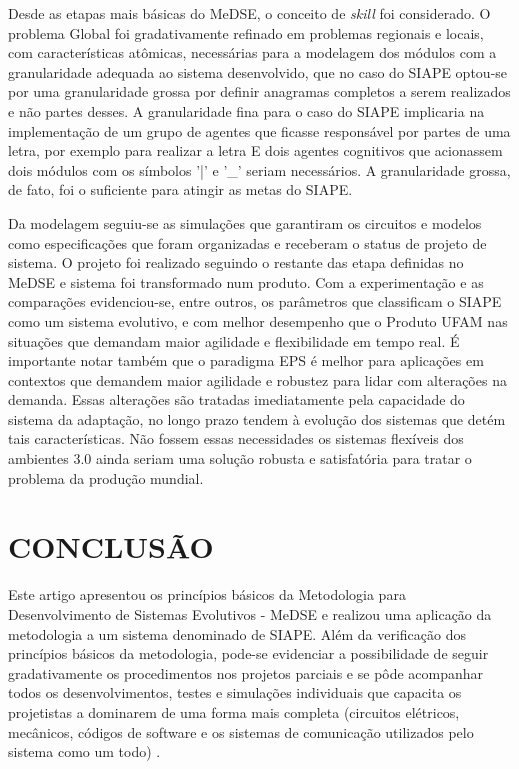 \documentclass[10pt,letterpaper,twocolumn]{IEEEtran}
\begin{document}
Desde as etapas mais básicas do MeDSE, o conceito de \textit{skill} foi considerado. O problema Global foi gradativamente refinado em problemas regionais e locais, com características atômicas, necessárias para a modelagem dos módulos com a granularidade adequada ao sistema desenvolvido, que no caso do SIAPE optou-se por uma granularidade grossa por definir anagramas completos a serem realizados e  não partes desses. A granularidade fina para o caso do SIAPE implicaria na implementação de um grupo de agentes que ficasse responsável por partes de uma letra, por exemplo para realizar a letra E dois agentes cognitivos que  acionassem dois módulos com os símbolos '|' e '\_'  seriam necessários. A granularidade grossa, de fato, foi o suficiente para atingir as metas do SIAPE.

Da modelagem seguiu-se as simulações que garantiram os circuitos e modelos como especificações que foram organizadas e receberam o status de projeto de sistema. O projeto foi realizado seguindo o restante das  etapa definidas no MeDSE e sistema foi transformado num produto. Com a experimentação e as comparações evidenciou-se, entre outros, os parâmetros que classificam o SIAPE como um sistema evolutivo, e com melhor desempenho que o Produto UFAM nas situações que demandam maior agilidade e flexibilidade em tempo real. É importante notar também que o paradigma EPS é melhor para aplicações em contextos que demandem maior agilidade e robustez para lidar com alterações na demanda. Essas alterações são tratadas imediatamente pela capacidade do sistema da adaptação, no longo prazo tendem à evolução dos sistemas que detém tais características. Não fossem essas necessidades os sistemas flexíveis dos ambientes 3.0 ainda seriam uma solução robusta e satisfatória para tratar o problema da produção mundial.   






\section{CONCLUSÃO}
Este artigo apresentou os princípios básicos da Metodologia para Desenvolvimento de Sistemas Evolutivos - MeDSE e realizou
uma aplicação da metodologia a um sistema denominado de SIAPE. Além da verificação dos princípios básicos da metodologia, pode-se evidenciar a possibilidade de seguir gradativamente os procedimentos nos projetos parciais e se pôde acompanhar todos os desenvolvimentos, testes e simulações
individuais que capacita os projetistas a dominarem de uma forma mais completa (circuitos elétricos, mecânicos, códigos de
software e os sistemas de comunicação utilizados pelo sistema como um todo) . \par
\end{document}
